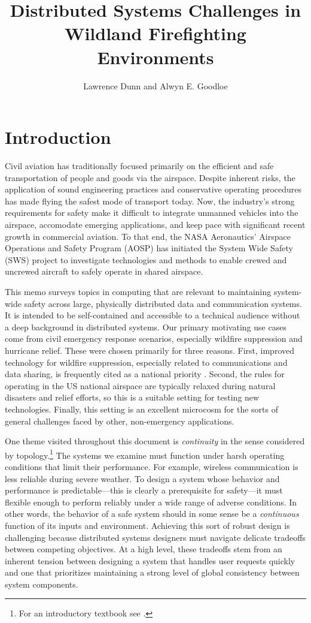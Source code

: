 \documentclass[]             %
{NASA}                       %
\title{Distributed Systems Challenges in Wildland Firefighting Environments}
\author{Lawrence Dunn and Alwyn E. Goodloe}
\theoremstyle{definition}
\begin{document}
\newpage
\setcounter{tocdepth}{2}
\tableofcontents
\newpage

\section{Introduction}
\label{sec:introduction}
Civil aviation has traditionally focused primarily on the efficient
and safe transportation of people and goods via the airspace. Despite
inherent risks, the application of sound engineering practices and
conservative operating procedures has made flying the safest mode of
transport today. Now, the industry's strong requirements for safety
make it difficult to integrate unmanned vehicles into the airspace,
accomodate emerging applications, and keep pace with significant
recent growth in commercial aviation. To that end, the NASA
Aeronautics' Airspace Operations and Safety Program (AOSP) has
initiated the System Wide Safety (SWS) project to investigate
technologies and methods to enable crewed and uncrewed aircraft to
safely operate in shared airspace.

This memo surveys topics in computing that are relevant to maintaining
system-wide safety across large, physically distributed data and
communication systems. It is intended to be self-contained and
accessible to a technical audience without a deep background in
distributed systems. Our primary motivating use cases come from civil
emergency response scenarios, especially wildfire suppression and
hurricane relief. These were chosen primarily for three
reasons. First, improved technology for wildfire suppression,
especially related to communications and data sharing, is frequently
cited as a national priority \cite{pcast2023}.  Second, the rules for
operating in the US national airspace are typically relaxed during
natural disasters and relief efforts, so this is a suitable setting
for testing new technologies. Finally, this setting is an excellent
microcosm for the sorts of general challenges faced by other,
non-emergency applications.

One theme visited throughout this document is \emph{continuity} in the
sense considered by topology.\footnote{For an introductory textbook
  see \cite{mendelson2012introduction}.}  The systems we examine must
function under harsh operating conditions that limit their
performance. For example, wireless communication is less reliable
during severe weather. To design a system whose behavior and
performance is predictable---this is clearly a prerequisite for
safety---it must flexible enough to perform reliably under a wide
range of adverse conditions. In other words, the behavior of a safe
system should in some sense be a \emph{continuous} function of its
inputs and environment. Achieving this sort of robust design is
challenging because distributed systems designers must navigate
delicate tradeoffs between competing objectives. At a high level,
these tradeoffs stem from an inherent tension between designing a
system that handles user requests quickly and one that prioritizes
maintaining a strong level of global consistency between system
components.
\end{document}
